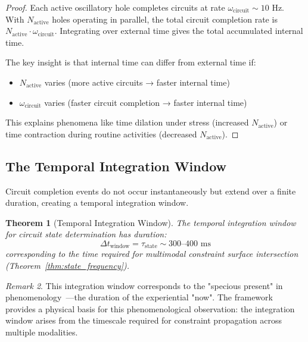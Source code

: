 \documentclass[aps,prd,twocolumn,superscriptaddress,floatfix,nofootinbib]{revtex4-2}
\newtheorem{theorem}{Theorem}[section]
\theoremstyle{remark}
\newtheorem{remark}[theorem]{Remark}
\begin{document}
\begin{proof}
Each active oscillatory hole completes circuits at rate $\omega_{\text{circuit}} \sim 10$ Hz. With $N_{\text{active}}$ holes operating in parallel, the total circuit completion rate is $N_{\text{active}} \cdot \omega_{\text{circuit}}$. Integrating over external time gives the total accumulated internal time.

The key insight is that internal time can differ from external time if:
\begin{itemize}
\item $N_{\text{active}}$ varies (more active circuits → faster internal time)
\item $\omega_{\text{circuit}}$ varies (faster circuit completion → faster internal time)
\end{itemize}

This explains phenomena like time dilation under stress (increased $N_{\text{active}}$) or time contraction during routine activities (decreased $N_{\text{active}}$).
\end{proof}

\subsection{The Temporal Integration Window}

Circuit completion events do not occur instantaneously but extend over a finite duration, creating a temporal integration window.

\begin{theorem}[Temporal Integration Window]
\label{cor:specious}
The temporal integration window for circuit state determination has duration:
\begin{equation}
\Delta t_{\text{window}} = \tau_{\text{state}} \sim 300\text{--}400 \text{ ms}
\end{equation}
corresponding to the time required for multimodal constraint surface intersection (Theorem~\ref{thm:state_frequency}).
\end{theorem}

\begin{remark}
This integration window corresponds to the "specious present" in phenomenology~\cite{james1890principles,poppel1997temporal}—the duration of the experiential "now". The framework provides a physical basis for this phenomenological observation: the integration window arises from the timescale required for constraint propagation across multiple modalities.
\end{remark}
\end{document}
